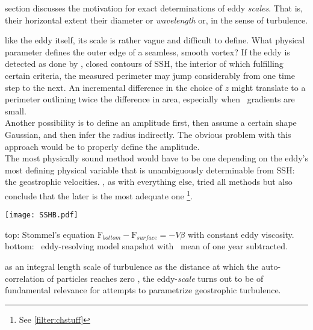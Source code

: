  section discusses the motivation for exact determinations of eddy \textit{scales}. That is, their horizontal extent \ie their diameter or \textit{wavelength} or, in the sense of turbulence.

 like the eddy itself, its scale is rather vague and difficult to define. What physical parameter defines the outer edge of a seamless, smooth vortex? If the eddy is detected as done by \citet{Chelton2011}, \ie closed contours of SSH, the interior of which fulfilling certain criteria, the measured perimeter may jump considerably from one time step to the next. An incremental difference in the choice of $z$ might translate to a perimeter outlining twice the  difference in area, especially when \SSH~gradients are small.\\
Another possibility is to define an amplitude first, then assume a certain shape \eg Gaussian, and then infer the radius indirectly. The obvious problem with this approach would be to properly define the amplitude.\\
The most physically sound method would have to be one depending on the eddy's most defining physical variable that is unambiguously determinable from SSH: the geostrophic velocities. \citet{Chelton2011}, as with everything else, tried all methods but also conclude that the later is the most adequate one \footnote{See \cref{filter:chstuff}}.

%
\begin{marginfigure}
\texttt{[image: SSHB.pdf]}
  \caption{top: Stommel's equation $\mathrm{F}_{bottom}-\mathrm{F}_{surface}= -V\beta$ with constant eddy viscosity. bottom: \POP~eddy-resolving model snapshot with \SSH~mean of one year subtracted. }
  \label{fig:SSHB}
\end{marginfigure}


 as an integral length scale of turbulence \ie as the distance at which the auto-correlation of particles reaches zero \citep{batchelor1969computation,Eden2007}, the eddy-\emph{scale} turns out to be of fundamental relevance for attempts to parametrize geostrophic turbulence.

